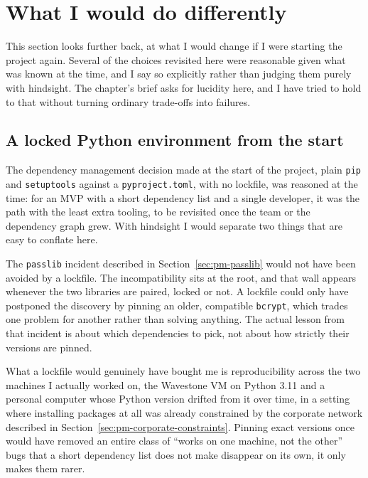 \section{What I would do differently}
\label{sec:pm-differently}

This section looks further back, at what I would change if I were starting the project again. Several of the choices revisited here were reasonable given what was known at the time, and I say so explicitly rather than judging them purely with hindsight. The chapter's brief asks for lucidity here, and I have tried to hold to that without turning ordinary trade-offs into failures.

\subsection{A locked Python environment from the start}
\label{sec:pm-lockfile}

The dependency management decision made at the start of the project, plain \texttt{pip} and \texttt{setuptools} against a \texttt{pyproject.toml}, with no lockfile, was reasoned at the time: for an MVP with a short dependency list and a single developer, it was the path with the least extra tooling, to be revisited once the team or the dependency graph grew. With hindsight I would separate two things that are easy to conflate here.

The \texttt{passlib} incident described in Section~\ref{sec:pm-passlib} would not have been avoided by a lockfile. The incompatibility sits at the root, and that wall appears whenever the two libraries are paired, locked or not. A lockfile could only have postponed the discovery by pinning an older, compatible \texttt{bcrypt}, which trades one problem for another rather than solving anything. The actual lesson from that incident is about which dependencies to pick, not about how strictly their versions are pinned.

What a lockfile would genuinely have bought me is reproducibility across the two machines I actually worked on, the Wavestone VM on Python 3.11 and a personal computer whose Python version drifted from it over time, in a setting where installing packages at all was already constrained by the corporate network described in Section~\ref{sec:pm-corporate-constraints}. Pinning exact versions once would have removed an entire class of ``works on one machine, not the other'' bugs that a short dependency list does not make disappear on its own, it only makes them rarer.

